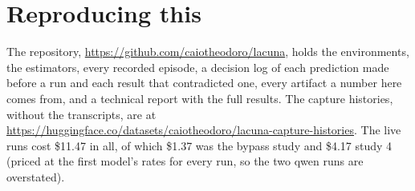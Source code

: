 \documentclass[11pt]{article}
\begin{document}
\section*{Reproducing this}

The repository, \url{https://github.com/caiotheodoro/lacuna}, holds the environments, the
estimators, every recorded episode, a decision log of each prediction made before a run and
each result that contradicted one, every artifact a number here comes from, and a technical
report with the full results. The capture histories, without the transcripts, are at
\url{https://huggingface.co/datasets/caiotheodoro/lacuna-capture-histories}. The live runs
cost \$11.47 in all, of which \$1.37 was the bypass study and \$4.17 study 4 (priced at the
first model's rates for every run, so the two qwen runs are overstated).


{\footnotesize\setlength{\bibsep}{0pt}}
\end{document}
